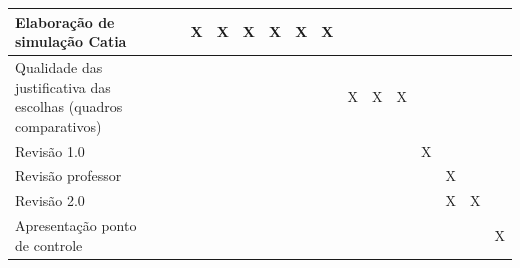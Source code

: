 \begin{table}[H]
\begin{tabular}{|p{2.5cm}|p{0.5cm}|p{0.5cm}|p{0.5cm}|p{0.5cm}|p{0.5cm}|p{0.5cm}|p{0.5cm}|p{0.5cm}|p{0.5cm}|p{0.5cm}|p{0.5cm}|p{0.5cm}|p{0.5cm}|p{0.5cm}|p{0.5cm}|}
    Elaboração de simulação Catia                                   &                           &                           & \cellcolor{blue}X & \cellcolor{blue}X & \cellcolor{blue}X & \cellcolor{blue}X & \cellcolor{blue}X & \cellcolor{blue}X &                           &                           &                           &                           &                           &                           &                           \\ \hline
    Qualidade das justificativa das escolhas (quadros comparativos) &                           &                           &                           &                           &                           &                           &                           &                           & \cellcolor{blue}X & \cellcolor{blue}X & \cellcolor{blue}X &                           &                           &                           &                           \\ \hline
    Revisão 1.0                                                     &                           &                           &                           &                           &                           &                           &                           &                           &                           &                           &                           & \cellcolor{blue}X &                           &                           &                           \\ \hline
    Revisão professor                                               &                           &                           &                           &                           &                           &                           &                           &                           &                           &                           &                           &                           & \cellcolor{blue}X &                           &                           \\ \hline
    Revisão 2.0                                                     &                           &                           &                           &                           &                           &                           &                           &                           &                           &                           &                           &                           & \cellcolor{blue}X & \cellcolor{blue}X &                           \\ \hline
    Apresentação ponto de controle                                  &                           &                           &                           &                           &                           &                           &                           &                           &                           &                           &                           &                           &                           &                           & \cellcolor{blue}X \\ \hline

\end{tabular}
\end{table}
